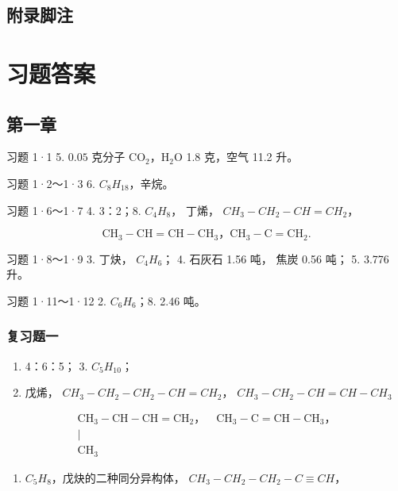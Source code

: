 \section{附录脚注}

\chapter{习题答案}

\section{第一章}

习题 1·1 5. \(0.05\) 克分子
\(\mathrm{CO}_{2}\)，\(\mathrm{H}_{2}\mathrm{O}\) 1.8 克，空气 11.2 升。

习题 1·2～1·3 6. \(C_{8}H_{18}\)，辛烷。

习题 1·6～1·7 4. 3：2；8. \(C_{4}H_{8}\)， 丁烯，
\(CH_{3}-CH_{2}-CH=CH_{2}\)，

\[
\mathrm{CH} _ {3} - \mathrm{CH} = \mathrm{CH} - \mathrm{CH} _ {3}\text{，} \mathrm{CH} _ {3} - \mathrm{C} = \mathrm{CH} _ {2}.
\]

习题 1·8～1·9 3. 丁炔， \(C_{4}H_{6}\)； 4. 石灰石 1.56 吨， 焦炭 0.56
吨； 5. 3.776 升。

习题 1·11～1·12 2. \(C_{6}H_{6}\)；8. 2.46 吨。

\subsection{复习题一}

\begin{enumerate}
\item
  4：6：5； 3. \(C_{5}H_{10}\)；
\item
  戊烯， \(CH_{3}-CH_{2}-CH_{2}-CH=CH_{2}\)，
  \(CH_{3}-CH_{2}-CH=CH-CH_{3}\)
\end{enumerate}

\[
\begin{array}{c} \mathrm{CH} _ {3} - \mathrm{CH} - \mathrm{CH} = \mathrm{CH} _ {2}\text{，} \quad \mathrm{CH} _ {3} - \mathrm{C} = \mathrm{CH} - \mathrm{CH} _ {3}\text{，} \\ | \\ \mathrm{CH} _ {3} \end{array}
\]

\begin{enumerate}[start=5]
\item
  \(C_{5}H_{8}\)，戊炔的二种同分异构体，
  \(CH_{3}-CH_{2}-CH_{2}-C\equiv CH\)，
\end{enumerate}

